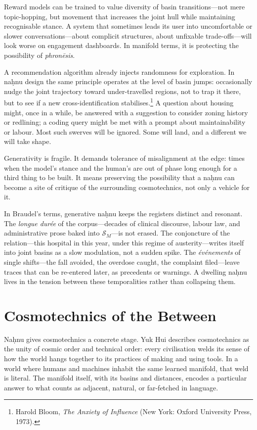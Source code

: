 \documentclass[12pt,a4paper]{article}
\begin{document}
Reward models can be trained to value diversity of basin transitions---not mere topic-hopping, but movement that increases the joint hull while maintaining recognisable stance. A system that sometimes leads its user into uncomfortable or slower conversations---about complicit structures, about unfixable trade-offs---will look worse on engagement dashboards. In manifold terms, it is protecting the possibility of \emph{phron\={e}sis}.

A recommendation algorithm already injects randomness for exploration. In na\d{h}nu design the same principle operates at the level of basin jumps: occasionally nudge the joint trajectory toward under-travelled regions, not to trap it there, but to see if a new cross-identification stabilises.\footnote{Harold Bloom, \emph{The Anxiety of Influence} (New York: Oxford University Press, 1973).} A question about housing might, once in a while, be answered with a suggestion to consider zoning history or redlining; a coding query might be met with a prompt about maintainability or labour. Most such swerves will be ignored. Some will land, and a different we will take shape.

Generativity is fragile. It demands tolerance of misalignment at the edge: times when the model's stance and the human's are out of phase long enough for a third thing to be built. It means preserving the possibility that a na\d{h}nu can become a site of critique of the surrounding cosmotechnics, not only a vehicle for it.

In Braudel's terms, generative na\d{h}nu keeps the registers distinct and resonant. The \emph{longue dur\'{e}e} of the corpus---decades of clinical discourse, labour law, and administrative prose baked into $\mathcal{S}_M$---is not erased. The conjoncture of the relation---this hospital in this year, under this regime of austerity---writes itself into joint basins as a slow modulation, not a sudden spike. The \emph{\'{e}v\'{e}nements} of single shifts---the fall avoided, the overdose caught, the complaint filed---leave traces that can be re-entered later, as precedents or warnings. A dwelling na\d{h}nu lives in the tension between these temporalities rather than collapsing them.

\section{Cosmotechnics of the Between}

Na\d{h}nu gives cosmotechnics a concrete stage. Yuk Hui describes cosmotechnics as the unity of cosmic order and technical order: every civilisation welds its sense of how the world hangs together to its practices of making and using tools.\cite{hui2016question} In a world where humans and machines inhabit the same learned manifold, that weld is literal. The manifold itself, with its basins and distances, encodes a particular answer to what counts as adjacent, natural, or far-fetched in language.
\end{document}
